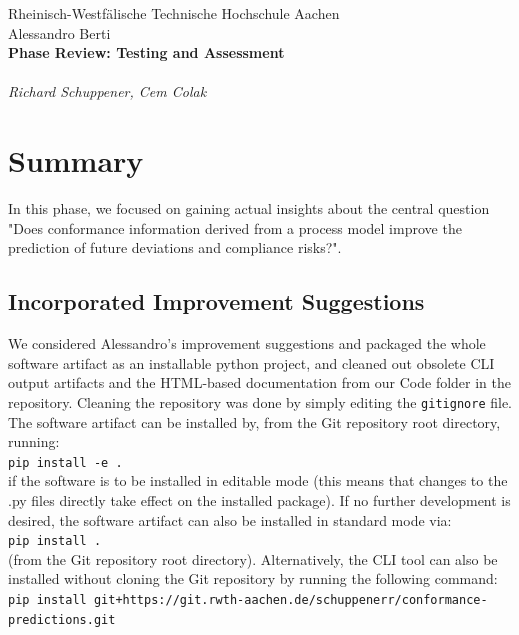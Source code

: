 \documentclass[12pt,a4paper]{article}
\begin{document}
\thispagestyle{empty}
\begin{center}
Rheinisch-Westf\"alische Technische Hochschule Aachen \\
Alessandro Berti\\[6ex]

\LARGE
	\textbf{Phase Review: Testing and Assessment} \\[6ex]
        \\
	\textit{Richard Schuppener, Cem Colak} \\[6ex]
\end{center}

\newpage

\tableofcontents
\newpage

\section{Summary}
In this phase, we focused on gaining actual insights about the central question "Does conformance information derived from a process model improve the prediction of future deviations and compliance risks?". 
\subsection{Incorporated Improvement Suggestions}
We considered Alessandro's improvement suggestions and packaged the whole software artifact as an installable python project, and cleaned out obsolete CLI output artifacts and the HTML-based documentation from our Code folder in the repository. Cleaning the repository was done by simply editing the \texttt{gitignore} file.
The software artifact can be installed by, from the Git repository root directory, running:\\
\texttt{pip install -e .}\\ 
if the software is to be installed in editable mode (this means that changes to the .py files directly take effect on the installed package).
If no further development is desired, the software artifact can also be installed in standard mode via:\\
\texttt{pip install .}\\ 
(from the Git repository root directory). Alternatively, the CLI tool can also be installed without cloning the Git repository by running the following command:\\
\texttt{pip install git+https://git.rwth-aachen.de/schuppenerr/conformance-predictions.git}\\
\end{document}

